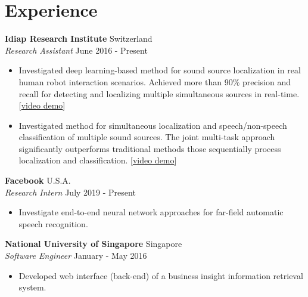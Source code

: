 \documentclass[a4paper,11pt]{article} %
\begin{document}

\section{Experience}

\textbf{Idiap Research Institute}  \hfill Switzerland \\
\textit{Research Assistant} \hfill June 2016 - Present
\vspace{-.9\parskip}
\begin{itemize}
  \item Investigated deep learning-based method for sound source localization in real human robot interaction scenarios. Achieved more than 90\% precision and recall for detecting and localizing multiple simultaneous sources in real-time.
    [\href{https://www.youtube.com/watch?v=_4EwuVlE_pU}{video demo}]
  \item Investigated method for simultaneous localization and speech/non-speech classification of multiple sound sources. The joint multi-task approach significantly outperforms traditional methods those sequentially process localization and classification.
    [\href{https://www.youtube.com/watch?v=O7bQvg03RTc}{video demo}]
\end{itemize}


\textbf{Facebook}  \hfill U.S.A. \\
\textit{Research Intern} \hfill July 2019 - Present
\vspace{-.9\parskip}
\begin{itemize}
  \item Investigate end-to-end neural network approaches for far-field automatic speech recognition.
\end{itemize}


\textbf{National University of Singapore}  \hfill Singapore \\
\textit{Software Engineer} \hfill January - May 2016
\vspace{-.9\parskip}
\begin{itemize}
  \item Developed web interface (back-end) of a business insight information retrieval system.
\end{itemize}
\end{document}
